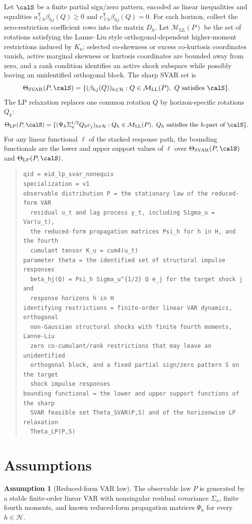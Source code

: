 \documentclass[11pt]{article}
\newcommand{\transpose}{\mathsf{T}}
\newcommand{\calH}{\mathcal{H}}
\theoremstyle{definition}
\newtheorem{assumption}{Assumption}
\theoremstyle{plain}
\theoremstyle{remark}
\begin{document}
Let $\calS$ be a finite partial sign/zero pattern, encoded as linear inequalities and equalities $a_{\ell h}^{\transpose}\beta_{hj}(Q)\ge 0$ and $c_{\ell h}^{\transpose}\beta_{hj}(Q)=0$.  For each horizon, collect the zero-restriction coefficient rows into the matrix $D_h$.  Let $\mathcal{M}_{\mathrm{LL}}(P)$ be the set of rotations satisfying the Lanne--Liu style orthogonal-dependent higher-moment restrictions induced by $K_u$: selected co-skewness or excess co-kurtosis coordinates vanish, active marginal skewness or kurtosis coordinates are bounded away from zero, and a rank condition identifies an active shock subspace while possibly leaving an unidentified orthogonal block.  The sharp SVAR set is
\[
  \Theta_{\mathrm{SVAR}}(P,\calS)=
  \{(\beta_{hj}(Q))_{h\in\calH}: Q\in\mathcal{M}_{\mathrm{LL}}(P),\ Q\text{ satisfies }\calS\}.
\]
The LP relaxation replaces one common rotation $Q$ by horizon-specific rotations $Q_h$:
\[
  \Theta_{\mathrm{LP}}(P,\calS)=
  \{(\Psi_h\Sigma_u^{1/2}Q_he_j)_{h\in\calH}: Q_h\in\mathcal{M}_{\mathrm{LL}}(P),\ Q_h\text{ satisfies the }h\text{-part of }\calS\}.
\]
For any linear functional $\ell$ of the stacked response path, the bounding functionals are the lower and upper support values of $\ell$ over $\Theta_{\mathrm{SVAR}}(P,\calS)$ and $\Theta_{\mathrm{LP}}(P,\calS)$.

\begin{quote}
\begin{verbatim}
qid = eid_lp_svar_nonequiv
specialization = v1
observable distribution P = the stationary law of the reduced-form VAR
  residual u_t and lag process y_t, including Sigma_u = Var(u_t),
  the reduced-form propagation matrices Psi_h for h in H, and the fourth
  cumulant tensor K_u = cum4(u_t)
parameter theta = the identified set of structural impulse responses
  beta_hj(Q) = Psi_h Sigma_u^{1/2} Q e_j for the target shock j and
  response horizons h in H
identifying restrictions = finite-order linear VAR dynamics, orthogonal
  non-Gaussian structural shocks with finite fourth moments, Lanne-Liu
  zero co-cumulant/rank restrictions that may leave an unidentified
  orthogonal block, and a fixed partial sign/zero pattern S on the target
  shock impulse responses
bounding functional = the lower and upper support functions of the sharp
  SVAR feasible set Theta_SVAR(P,S) and of the horizonwise LP relaxation
  Theta_LP(P,S)
\end{verbatim}
\end{quote}

\section{Assumptions}
\begin{assumption}[Reduced-form VAR law]\label{ass:var-law}
The observable law $P$ is generated by a stable finite-order linear VAR with nonsingular residual covariance $\Sigma_u$, finite fourth moments, and known reduced-form propagation matrices $\Psi_h$ for every $h\in\calH$.
\end{assumption}
\end{document}
